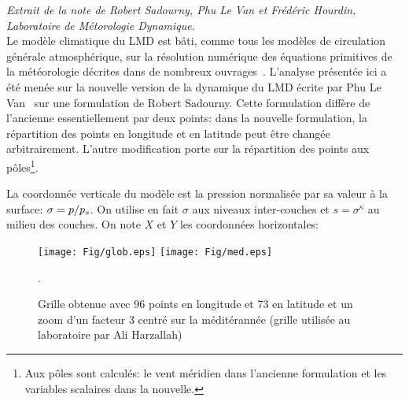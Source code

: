 

{\it Extrait de la note de Robert Sadourny, Phu Le Van et Fr\'ed\'eric
Hourdin, Laboratoire de M\protect\'etorologie Dynamique}.\\


Le mod\`ele climatique du LMD est b\^ati, comme tous les
mod\`eles de circulation g\'en\'erale atmosph\'erique,
sur la r\'esolution num\'erique des {\'equations primitives
de la m\'et\'eorologie} d\'ecrites dans de nombreux
ouvrages~\cite{Holt:79}.
L'analyse pr\'esent\'ee ici a \'et\'e men\'ee sur la nouvelle
version de la dynamique du LMD \'ecrite par Phu Le Van~\cite{LeVa:89}
sur une formulation de Robert Sadourny.
Cette formulation diff\`ere de l'ancienne essentiellement
par deux points:
dans la nouvelle formulation, la r\'epartition des points en
longitude et en latitude peut \^etre chang\'ee arbitrairement.
L'autre modification porte sur la r\'epartition des points
aux p\^oles\footnote{Aux p\^oles sont calcul\'es:
le vent m\'eridien dans l'ancienne formulation et les variables
scalaires dans la nouvelle.}.

La coordonn\'ee  verticale du mod\`ele est la pression normalis\'ee
par sa valeur \`a la surface: $\sigma=p/p_s$.
On utilise en fait $\sigma$ aux niveaux inter-couches
et $s=\sigma^\kappa$ au milieu des couches.
On note $X$ et $Y$ les coordonn\'ees horizontales:

\begin{figure}
\begin{center}
\texttt{[image: Fig/glob.eps]}
\texttt{[image: Fig/med.eps]}
\caption{Grille obtenue avec 96 points en longitude et 73 en latitude et
un zoom d'un facteur 3 centr\'e sur la m\'edit\'erann\'ee (grille utilis\'ee au laboratoire par Ali Harzallah)\label{fg:zoom}}.
\end{center}
\end{figure}

